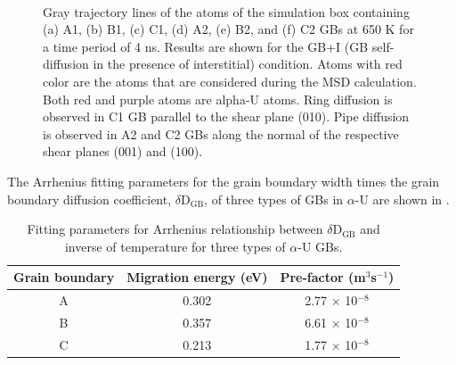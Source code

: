 \documentclass[review]{elsarticle}
\begin{document}
\begin{figure}[h!]
\\
\caption{Gray trajectory lines of the atoms of the simulation box containing (a) A1, (b) B1, (c) C1, (d) A2, (e) B2, and (f) C2 GBs at 650 K for a time period of 4 ns. Results are shown for the GB+I (GB self-diffusion in the presence of interstitial) condition. Atoms with red color are the atoms that are considered during the MSD calculation. Both red and purple atoms are alpha-U atoms. Ring diffusion is observed in C1 GB parallel to the shear plane (010). Pipe diffusion is observed in A2 and C2 GBs along the normal of the respective shear planes (001) and (100).}
\label{fig:diffusion_path}
\end{figure}

The Arrhenius fitting parameters for the grain boundary width times the grain boundary diffusion coefficient, $\delta$D$_\mathrm{GB}$, of three types of GBs in $\alpha$-U are shown in .

\begin{table}[h!]
\centering
\caption{ Fitting parameters for Arrhenius relationship between $\delta$D$_\mathrm{GB}$ and inverse of temperature for three types of $\alpha$-U GBs. \label{tab:widthanddiff}}
\begin{tabular}{|c|c|c|}
\hline
\multicolumn{1}{|c}{Grain boundary}
& \multicolumn{1}{|c}{Migration energy (eV) } & \multicolumn{1}{c|}{Pre-factor (m$^{3}$s$^{-1}$) } \\
\hline

A & 0.302 & 2.77 $\times$ 10$^{-8}$ \\
B & 0.357 & 6.61 $\times$ 10$^{-8}$ \\
C & 0.213 & 1.77 $\times$ 10$^{-8}$ \\

\hline
\end{tabular}
\end{table}
\end{document}
